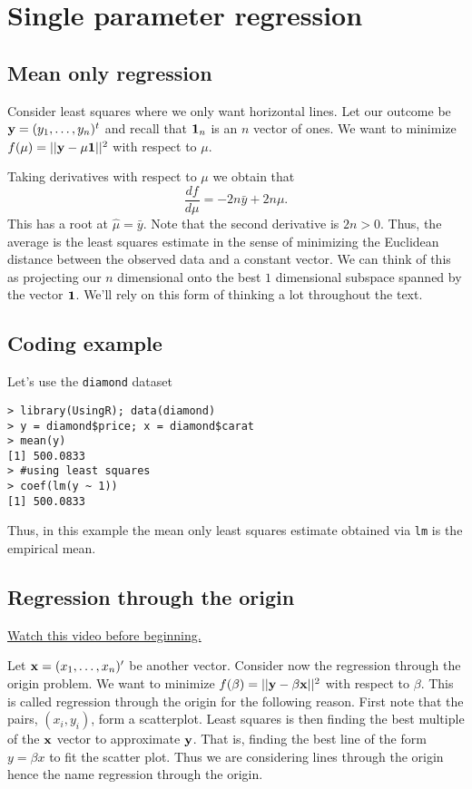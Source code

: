 \chapter{Single parameter regression}

\section{Mean only regression}



Consider least squares where we only want horizontal lines. 
Let our outcome be
$
\mathbf{y} = (y_1,\ldots, y_n)^t
$ and recall that $\mathbf{1}_n$ is an $n$ vector of ones. We want
to minimize 
$f(\mu) = ||\mathbf{y} - \mu \mathbf{1}||^2$ with respect to $\mu$. 

Taking derivatives with respect to $\mu$ we obtain that
$$
\frac{d f}{d\mu} = - 2n \bar y  + 2 n \mu.
$$
This has a root at $\hat \mu = \bar y$. Note that the second
derivative is $2n>0$. 
Thus, the average is the least squares estimate in the
sense of minimizing the Euclidean distance between the
observed data and a constant vector. We can think of this
as projecting our $n$ dimensional onto the best $1$
dimensional subspace spanned by the vector $\mathbf{1}$. We'll
rely on this form of thinking a lot throughout the text.

\section{Coding example}
\href{}{}

Let's use the \texttt{diamond} dataset 
\begin{verbatim}
> library(UsingR); data(diamond)
> y = diamond$price; x = diamond$carat
> mean(y)
[1] 500.0833
> #using least squares
> coef(lm(y ~ 1))
[1] 500.0833
\end{verbatim}

Thus, in this example the mean only least squares estimate obtained via \texttt{lm} 
is the empirical mean.

\section{Regression through the origin}

\href{https://www.youtube.com/watch?v=1ZFED8AcHWc&index=7&list=PLpl-gQkQivXhdgUCdaUQcdb31CRe8Mm2y}{Watch this video before beginning.}

Let $\mathbf{x} = (x_1,\ldots, x_n)'$ be another vector. Consider now the
regression through the origin problem. We want to minimize
$f(\beta) = ||\mathbf{y} - \beta \mathbf{x}||^2$ with respect to $\beta$.
This is called regression through the origin for the following
reason. First note that the pairs, $(x_i, y_i)$,
form a scatterplot. Least squares is then finding the best
multiple of the $\mathbf{x}$ vector to approximate $\mathbf{y}$. That is,
finding the best line of the form $y = \beta x$ to fit
the scatter plot. Thus we are considering lines through the origin
hence the name regression through the origin.

